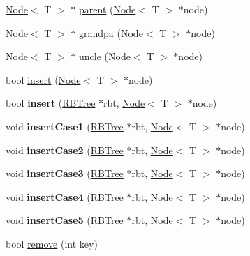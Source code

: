 \begin{DoxyCompactItemize}
\hyperlink{class_node}{Node}$<$ T $>$ $\ast$ \hyperlink{class_r_b_tree_aabfe3497ee633a9864ec84fdb153c67d}{parent} (\hyperlink{class_node}{Node}$<$ T $>$ $\ast$node)
\item 
\hyperlink{class_node}{Node}$<$ T $>$ $\ast$ \hyperlink{class_r_b_tree_a9c1ef0de31b6bf2617a458a0e9d0bcef}{grandpa} (\hyperlink{class_node}{Node}$<$ T $>$ $\ast$node)
\item 
\hyperlink{class_node}{Node}$<$ T $>$ $\ast$ \hyperlink{class_r_b_tree_af60f8017b52f69173e0af61c8e581b48}{uncle} (\hyperlink{class_node}{Node}$<$ T $>$ $\ast$node)
\item 
bool \hyperlink{class_r_b_tree_a8f67ba964a14d252ff6851a46576399e}{insert} (\hyperlink{class_node}{Node}$<$ T $>$ $\ast$node)
\item 
\hypertarget{class_r_b_tree_aa3450616177356179bbd79dd043c61a2}{}bool {\bfseries insert} (\hyperlink{class_r_b_tree}{R\+B\+Tree} $\ast$rbt, \hyperlink{class_node}{Node}$<$ T $>$ $\ast$node)\label{class_r_b_tree_aa3450616177356179bbd79dd043c61a2}

\item 
\hypertarget{class_r_b_tree_aca1969f82829cc4d8145899a9ef0eb18}{}void {\bfseries insert\+Case1} (\hyperlink{class_r_b_tree}{R\+B\+Tree} $\ast$rbt, \hyperlink{class_node}{Node}$<$ T $>$ $\ast$node)\label{class_r_b_tree_aca1969f82829cc4d8145899a9ef0eb18}

\item 
\hypertarget{class_r_b_tree_a5379cd21ee5e267de94358fd8ba18949}{}void {\bfseries insert\+Case2} (\hyperlink{class_r_b_tree}{R\+B\+Tree} $\ast$rbt, \hyperlink{class_node}{Node}$<$ T $>$ $\ast$node)\label{class_r_b_tree_a5379cd21ee5e267de94358fd8ba18949}

\item 
\hypertarget{class_r_b_tree_a31aae1f3acd0dc86e2271afd1ea5e93a}{}void {\bfseries insert\+Case3} (\hyperlink{class_r_b_tree}{R\+B\+Tree} $\ast$rbt, \hyperlink{class_node}{Node}$<$ T $>$ $\ast$node)\label{class_r_b_tree_a31aae1f3acd0dc86e2271afd1ea5e93a}

\item 
\hypertarget{class_r_b_tree_accabb892aa264d8d8c10858272c09ffb}{}void {\bfseries insert\+Case4} (\hyperlink{class_r_b_tree}{R\+B\+Tree} $\ast$rbt, \hyperlink{class_node}{Node}$<$ T $>$ $\ast$node)\label{class_r_b_tree_accabb892aa264d8d8c10858272c09ffb}

\item 
\hypertarget{class_r_b_tree_a80860b7d32b5b45c5bd71c53d6fb9db1}{}void {\bfseries insert\+Case5} (\hyperlink{class_r_b_tree}{R\+B\+Tree} $\ast$rbt, \hyperlink{class_node}{Node}$<$ T $>$ $\ast$node)\label{class_r_b_tree_a80860b7d32b5b45c5bd71c53d6fb9db1}

\item 
bool \hyperlink{class_r_b_tree_a9a20aef5e8862b34bccc3d1f1c47a321}{remove} (int key)
\end{DoxyCompactItemize}


